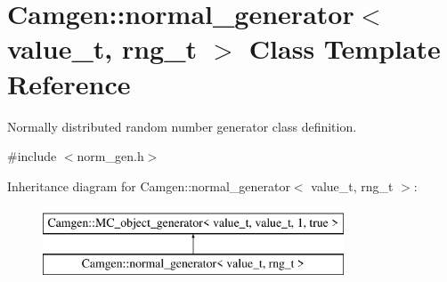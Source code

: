 \hypertarget{a00381}{\section{Camgen\-:\-:normal\-\_\-generator$<$ value\-\_\-t, rng\-\_\-t $>$ Class Template Reference}
\label{a00381}
}


Normally distributed random number generator class definition.  




{\ttfamily \#include $<$norm\-\_\-gen.\-h$>$}

Inheritance diagram for Camgen\-:\-:normal\-\_\-generator$<$ value\-\_\-t, rng\-\_\-t $>$\-:\begin{figure}[H]
\begin{center}
\leavevmode
\includegraphics[height=2.000000cm]{a00381}
\end{center}
\end{figure}
